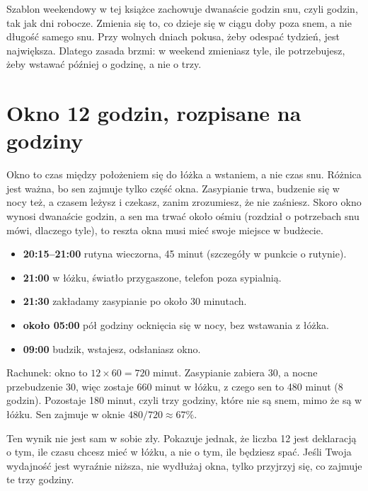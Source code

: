Szablon weekendowy w tej książce zachowuje dwanaście godzin snu, czyli  godzin, tak jak dni robocze. Zmienia się to, co dzieje się w ciągu doby poza snem, a nie długość samego snu. Przy wolnych dniach pokusa, żeby \glqq{}odespać\grqq{} tydzień, jest największa. Dlatego zasada brzmi: w weekend zmieniasz tyle, ile potrzebujesz, żeby wstawać później o godzinę, a nie o trzy.

\section{Okno 12 godzin, rozpisane na godziny}

Okno to czas między położeniem się do łóżka a wstaniem, a nie czas snu. Różnica jest ważna, bo sen zajmuje tylko część okna. Zasypianie trwa, budzenie się w nocy też, a czasem leżysz i czekasz, zanim zrozumiesz, że nie zaśniesz. Skoro okno wynosi dwanaście godzin, a sen ma trwać około ośmiu (rozdział o potrzebach snu mówi, dlaczego tyle), to reszta okna musi mieć swoje miejsce w budżecie.

\begin{przyklad}
\begin{itemize}
\item \textbf{20:15--21:00} rutyna wieczorna, 45 minut (szczegóły w punkcie o rutynie).
\item \textbf{21:00} w łóżku, światło przygaszone, telefon poza sypialnią.
\item \textbf{21:30} zakładamy zasypianie po około 30 minutach. 
\item \textbf{około 05:00} pół godziny ocknięcia się w nocy, bez wstawania z łóżka.
\item \textbf{09:00} budzik, wstajesz, odsłaniasz okno.
\end{itemize}
Rachunek: okno to $12 \times 60 = 720$ minut. Zasypianie zabiera 30, a nocne przebudzenie 30, więc zostaje 660 minut w łóżku, z czego sen to 480 minut (8 godzin). Pozostaje 180 minut, czyli trzy godziny, które nie są snem, mimo że są w łóżku. Sen zajmuje w oknie $480/720 \approx 67\%$.
\end{przyklad}

Ten wynik nie jest sam w sobie zły. Pokazuje jednak, że liczba 12 jest deklaracją o tym, ile czasu chcesz mieć w łóżku, a nie o tym, ile będziesz spać.  Jeśli Twoja wydajność jest wyraźnie niższa, nie wydłużaj okna, tylko przyjrzyj się, co zajmuje te trzy godziny.

